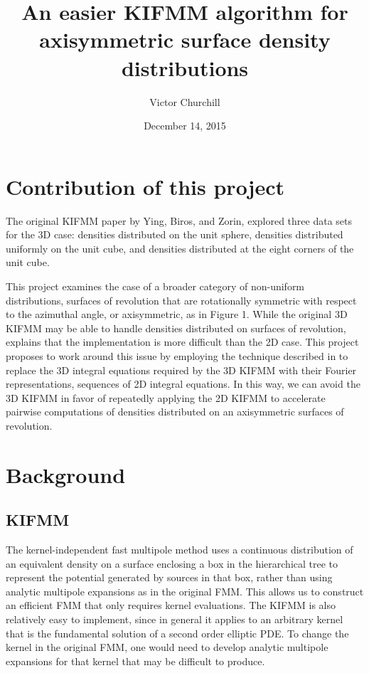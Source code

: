 \documentclass[12pt,letterpaper]{article}
\begin{document}

\title{An easier KIFMM algorithm for\\axisymmetric surface density distributions}
\date{December 14, 2015}
\author{Victor Churchill}
\clearpage
\maketitle
\thispagestyle{empty}

\newpage

\section{Contribution of this project}

The original KIFMM paper by Ying, Biros, and Zorin, explored three data sets for the 3D case: densities distributed on the unit sphere, densities distributed uniformly on the unit cube, and densities distributed at the eight corners of the unit cube.

This project examines the case of a broader category of non-uniform distributions, surfaces of revolution that are rotationally symmetric with respect to the azimuthal angle, or axisymmetric, as in Figure 1. While the original 3D KIFMM may be able to handle densities distributed on surfaces of revolution, \cite{YBZ} explains that the implementation is more difficult than the 2D case. This project proposes to work around this issue by employing the technique described in \cite{YYM} to replace the 3D integral equations required by the 3D KIFMM with their Fourier representations, sequences of 2D integral equations. In this way, we can avoid the 3D KIFMM in favor of repeatedly applying the 2D KIFMM to accelerate pairwise computations of densities distributed on an axisymmetric surfaces of revolution.

\section{Background}

\subsection{KIFMM}
The kernel-independent fast multipole method uses a continuous distribution of an equivalent density on a surface enclosing a box in the hierarchical tree to represent the potential generated by sources in that box, rather than using analytic multipole expansions as in the original FMM. This allows us to construct an efficient FMM that only requires kernel evaluations. The KIFMM is also relatively easy to implement, since in general it applies to an arbitrary kernel that is the fundamental solution of a second order elliptic PDE. To change the kernel in the original FMM, one would need to develop analytic multipole expansions for that kernel that may be difficult to produce.
\end{document}
